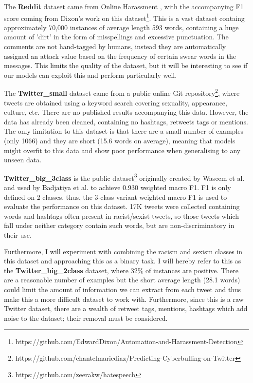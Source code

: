 \documentclass[12pt,a4paper]{article}
\begin{document}
The \textbf{Reddit} dataset came from Online Harassment \cite{Golbeck}, with the accompanying F1 score coming from Dixon's work \citeyear{Dixon} on this dataset\footnote{https://github.com/EdwardDixon/Automation-and-Harassment-Detection}. This is a vast dataset containg approximately 70,000 instances of average length 593 words, containing a huge amount of 'dirt' in the form of misspellings and excessive punctuation. The comments are not hand-tagged by humans, instead they are automatically assigned an attack value based on the frequency of certain swear words in the messages. This limits the quality of the dataset, but it will be interesting to see if our models can exploit this and perform particularly well.

The \textbf{Twitter\_small} dataset came from a public online Git repository\footnote{https://github.com/chantelmariediaz/Predicting-Cyberbulling-on-Twitter}, where tweets are obtained using a keyword search covering sexuality, appearance, culture, etc. There are no published results accompanying this data. However, the data has already been cleaned, containing no hashtags, retweets tags or mentions. The only limitation to this dataset is that there are a small number of examples (only 1066) and they are short (15.6 words on average), meaning that models might overfit to this data and show poor performance when generalising to any unseen data.

\textbf{Twitter\_big\_3class} is the public dataset\footnote{https://github.com/zeerakw/hatespeech} originally created by Waseem et al. \citeyear{Waseem} and used by Badjatiya et al.\citeyear{Badjatiya} to achieve 0.930 weighted macro F1. F1 is only defined on 2 classes, thus, the 3-class variant weighted macro F1 is used to evaluate the performance on this dataset. 17K tweets were collected containing words and hashtags often present in racist/sexist tweets, so those tweets which fall under neither category contain such words, but are non-discriminatory in their use.

Furthermore, I will experiment with combining the racism and sexism classes in this dataset and approaching this as a binary task. I will hereby refer to this as the \textbf{Twitter\_big\_2class} dataset, where 32\% of instances are positive. There are a reasonable number of examples but the short average length (28.1 words) could limit the amount of information we can extract from each tweet and thus make this a more difficult dataset to work with. Furthermore, since this is a raw Twitter dataset, there are a wealth of retweet tags, mentions, hashtags which add noise to the dataset; their removal must be considered.
\end{document}
